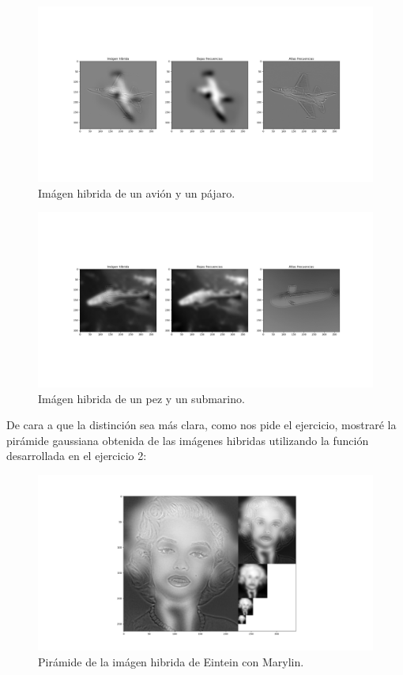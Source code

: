 \documentclass[12pt, spanish]{article}
\begin{document}
\begin{figure}[H]
  \centering
      \includegraphics[width=\textwidth]{hibridas/A-P.png}
 		 \caption{Imágen hibrida de un avión y un pájaro.}
  		\label{fig:ej2al}

\end{figure}

\begin{figure}[H]
  \centering
      \includegraphics[width=\textwidth]{hibridas/P-S.png}
 		 \caption{Imágen hibrida de un pez y un submarino.}
  		\label{fig:ej2al}

\end{figure}


De cara a que la distinción sea más clara, como nos pide el ejercicio, mostraré la pirámide gaussiana obtenida de las imágenes hibridas utilizando la función desarrollada en el ejercicio 2:



\begin{figure}[H]
  \centering
      \includegraphics[width=\textwidth]{hibridas/PE-M.png}
 		 \caption{Pirámide de la imágen hibrida de Eintein con Marylin.}
  		\label{fig:ej2al}

\end{figure}
\end{document}
